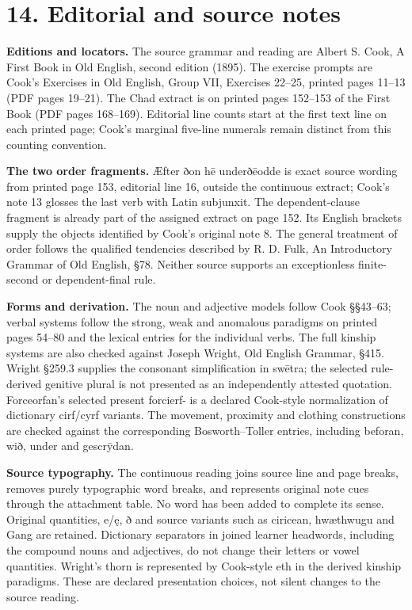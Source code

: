 \section*{14. Editorial and source notes}

\fontsize{10}{12}\selectfont
\textbf{Editions and locators.} The source grammar and reading are Albert S. Cook, A First Book in Old English, second edition (1895). The exercise prompts are Cook’s Exercises in Old English, Group VII, Exercises 22–25, printed pages 11–13 (PDF pages 19–21). The Chad extract is on printed pages 152–153 of the First Book (PDF pages 168–169). Editorial line counts start at the first text line on each printed page; Cook’s marginal five-line numerals remain distinct from this counting convention.

\textbf{The two order fragments.} Æfter ðon hē underðēodde is exact source wording from printed page 153, editorial line 16, outside the continuous extract; Cook’s note 13 glosses the last verb with Latin subjunxit. The dependent-clause fragment is already part of the assigned extract on page 152. Its English brackets supply the objects identified by Cook’s original note 8. The general treatment of order follows the qualified tendencies described by R. D. Fulk, An Introductory Grammar of Old English, §78. Neither source supports an exceptionless finite-second or dependent-final rule.

\textbf{Forms and derivation.} The noun and adjective models follow Cook §§43–63; verbal systems follow the strong, weak and anomalous paradigms on printed pages 54–80 and the lexical entries for the individual verbs. The full kinship systems are also checked against Joseph Wright, Old English Grammar, §415. Wright §259.3 supplies the consonant simplification in swētra; the selected rule-derived genitive plural is not presented as an independently attested quotation. Forceorfan’s selected present forcierf- is a declared Cook-style normalization of dictionary cirf/\allowbreak{}cyrf variants. The movement, proximity and clothing constructions are checked against the corresponding Bosworth–Toller entries, including beforan, wið, under and gescrȳdan.

\textbf{Source typography.} The continuous reading joins source line and page breaks, removes purely typographic word breaks, and represents original note cues through the attachment table. No word has been added to complete its sense. Original quantities, e/\allowbreak{}ę, ð and source variants such as ciricean, hwæthwugu and Gang are retained. Dictionary separators in joined learner headwords, including the compound nouns and adjectives, do not change their letters or vowel quantities. Wright’s thorn is represented by Cook-style eth in the derived kinship paradigms. These are declared presentation choices, not silent changes to the source reading.

